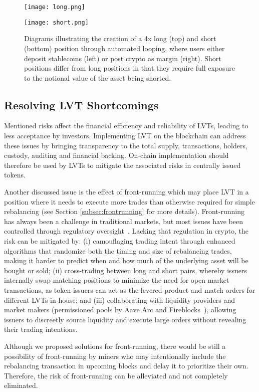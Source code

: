 \begin{figure}[p]
	\centering
	\texttt{[image: long.png]}
	\caption[Long vs. Short Position Creation]{Diagrams illustrating the creation of a 4x long (top) and short (bottom) position through automated looping, where users either deposit stablecoins (left) or post crypto as margin (right). Short positions differ from long positions in that they require full exposure to the notional value of the asset being shorted.}
	\centering
	\texttt{[image: short.png]}
	\label{fig:looping}
\end{figure}

\subsection{Resolving LVT Shortcomings}\label{subsec:resolve}
Mentioned risks affect the financial efficiency and reliability of LVTs, leading to less acceptance by investors. Implementing LVT on the blockchain can address these issues by bringing transparency to the total supply, transactions, holders, custody, auditing and financial backing. On-chain implementation should therefore be used by LVTs to mitigate the associated risks in centrally issued tokens.

Another discussed issue is the effect of front-running which may place LVT in a position where it needs to execute more trades than otherwise required for simple rebalancing (see Section \ref{subsec:frontrunning} for more details). Front-running has always been a challenge in traditional markets, but most issues have been controlled through regulatory oversight~\cite{SEC_Oversight}. Lacking that regulation in crypto, the risk can be mitigated by: (i) camouflaging trading intent through enhanced algorithms that randomize both the timing and size of rebalancing trades, making it harder to predict when and how much of the underlying asset will be bought or sold; (ii) cross-trading between long and short pairs, whereby issuers internally swap matching positions to minimize the need for open market transactions, as token issuers can act as the levered product and match orders for different LVTs in-house; and (iii) collaborating with liquidity providers and market makers (\eg permissioned pools by Aave Arc and Fireblocks~\cite{Aave_Arc}), allowing issuers to discreetly source liquidity and execute large orders without revealing their trading intentions.

Although we proposed solutions for front-running, there would be still a possibility of front-running by miners who may intentionally include the rebalancing transaction in upcoming blocks and delay it to prioritize their own. Therefore, the risk of front-running can be alleviated and not completely eliminated.

